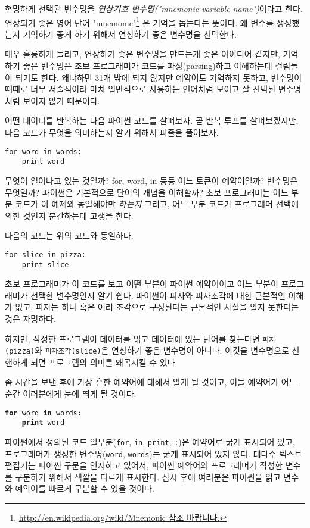 현명하게 선택된 변수명을 \emph{연상기호 변수명("mnemonic variable name")}이라고 한다. 연상되기 좋은 영어 단어 "mnemonic"\footnote{ 
\url{http://en.wikipedia.org/wiki/Mnemonic 참조 바랍니다.}}
은 기억을 돕는다는 뜻이다. 
왜 변수를 생성했는지 기억하기 좋게 하기 위해서 연상하기 좋은 변수명을 선택한다.

매우 훌륭하게 들리고, 연상하기 좋은 변수명을 만드는게 좋은 아이디어 같지만, 
기억하기 좋은 변수명은 초보 프로그래머가 코드를 파싱(parsing)하고 이해하는데 걸림돌이 되기도 한다. 
왜냐하면 31개 밖에 되지 않지만 예약어도 기억하지 못하고,
변수명이 때때로 너무 서술적이라 마치 일반적으로 사용하는 언어처럼 보이고 잘 선택된 변수명처럼 보이지 않기 때문이다.

어떤 데이터를 반복하는 다음 파이썬 코드를 살펴보자. 
곧 반복 루프를 살펴보겠지만, 다음 코드가 무엇을 의미하는지 알기 위해서 퍼즐을 풀어보자.

\beforeverb
\begin{verbatim}
for word in words:
    print word
\end{verbatim}
\afterverb
%
무엇이 일어나고 있는 것일까?
for, word, in 등등 어느 토큰이 예약어일까? 
변수명은 무엇일까? 
파이썬은 기본적으로 단어의 개념을 이해할까? 
초보 프로그래머는 어느 부분 코드가 이 예제와 동일해야만 \emph{하는지} 그리고, 
어느 부분 코드가 프로그래머 선택에 의한 것인지 분간하는데 고생을 한다.

다음의 코드는 위의 코드와 동일하다.

\beforeverb
\begin{verbatim}
for slice in pizza:
    print slice
\end{verbatim}
\afterverb
%
초보 프로그래머가 이 코드를 보고 어떤 부분이 파이썬 예약어이고 어느 부분이 프로그래머가 선택한 변수명인지 알기 쉽다. 
파이썬이 피자와 피자조각에 대한 근본적인 이해가 없고, 피자는 하나 혹은 여러 조각으로 구성된다는 근본적인 사실을 알지 못한다는 것은 자명하다.

하지만, 작성한 프로그램이 데이터를 읽고 데이터에 있는 단어를 찾는다면 {\tt 피자(pizza)}와 {\tt 피자조각(slice)}은 연상하기 좋은 변수명이 아니다. 이것을 변수명으로 선핸하게 되면 프로그램의 의미를 왜곡시킬 수 있다.

좀 시간을 보낸 후에 가장 흔한 예약어에 대해서 알게 될 것이고, 이들 예약어가 어느 순간 여러분에게 눈에 띄게 될 것이다.

{\tt {\bf for} word {\bf in} words{\bf :}\\
\verb"    "{\bf print} word }

파이썬에서 정의된 코드 일부분({\tt for}, {\tt in}, {\tt print}, {\tt :})은 예약어로 굵게 표시되어 있고, 
프로그래머가 생성한 변수명({\tt word}, {\tt words})는 굵게 표시되어 있지 않다. 
대다수 텍스트 편집기는 파이썬 구문을 인지하고 있어서, 
파이썬 예약어와 프로그래머가 작성한 변수를 구분하기 위해서 색깔을 다르게 표시한다. 
잠시 후에 여러분은 파이썬을 읽고 변수와 예약어를 빠르게 구분할 수 있을 것이다.

